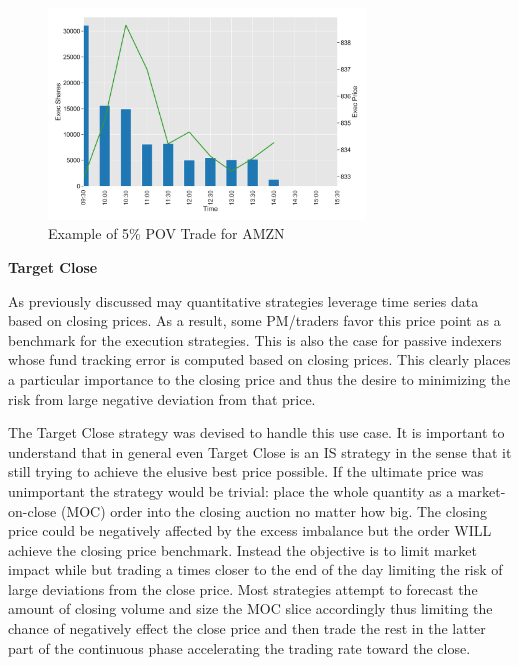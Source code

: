 	\begin{figure}[!ht]
	\centering
	\includegraphics[width=0.75\textwidth]{chapters/chapter_exec_models/figures/pov.png} 
	\caption{Example of 5\% POV Trade for AMZN \label{fig:pov}}
	\end{figure}


\noindent\textbf{Target Close} \twomedskip


As previously discussed may quantitative strategies leverage time series data based on closing prices. As a result, some PM/traders favor this price point as a benchmark for the execution strategies. This is also the case for passive indexers whose fund tracking error is computed based on closing prices. This clearly places a particular importance to the closing price and thus the desire to minimizing the risk from large negative deviation from that price.


The Target Close strategy was devised to handle this use case. It is important to understand that in general even Target Close is an IS strategy in the sense that it still trying to achieve the elusive best price possible. If the ultimate price was unimportant the strategy would be trivial: place the whole quantity as a market-on-close (MOC) order into the closing auction no matter how big. The closing price could be negatively affected by the excess imbalance but the order WILL achieve the closing price benchmark. Instead the objective is to limit market impact while but trading a times closer to the end of the day limiting the risk of large deviations from the close price. Most strategies attempt to forecast the amount of closing volume and size the MOC slice accordingly thus limiting the chance of negatively effect the close price and then trade the rest in the latter part of the continuous phase accelerating the trading rate toward the close. \twomedskip


